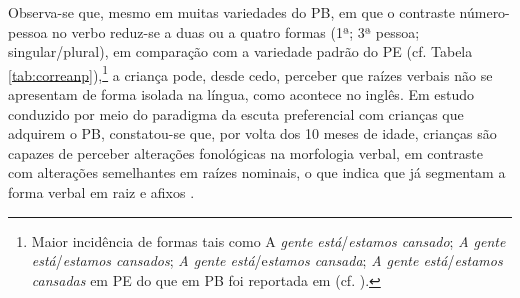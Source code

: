 \documentclass[output=paper]{LSP/langsci}
\begin{document}
Observa-se que, mesmo em muitas variedades do PB, em que o contraste nú\-me\-ro-pessoa no verbo reduz-se a duas ou a quatro formas (1ª; 3ª pessoa; singular/plural), em comparação com a variedade padrão do PE (cf. Tabela \ref{tab:correanp}),\footnote{Maior incidência de formas tais como A\textit{ gente está}/\textit{estamos cansado}; \textit{A gente está}/\textit{estamos cansados}; \textit{A gente está}/e\textit{stamos cansada}; \textit{A gente está}/\textit{estamos cansadas} em PE do que em PB foi reportada em \citet{martoculio_etal2013} (cf. \citealt{vieirabrandao2014}).
} a criança pode, desde cedo, perceber que raízes verbais não se apresentam de forma isolada na língua, como acontece no inglês. Em estudo conduzido por meio do paradigma da escuta preferencial com crianças que adquirem o PB, constatou-se que, por volta dos 10 meses de idade, crianças são capazes de perceber alterações fonológicas na morfologia verbal, em contraste com alterações semelhantes em raízes nominais, o que indica que já segmentam a forma verbal em raiz e afixos \citep{bagetticorrea2011}.
\end{document}
